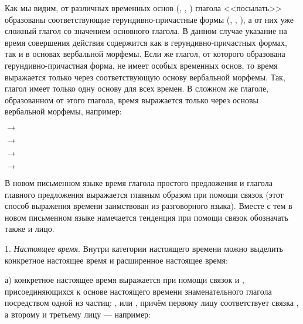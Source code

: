 Как мы видим, от различных временных основ (, , ) глагола <<посылать>> образованы соответствующие герундивно-причастные формы (, , ), а от них уже сложный глагол со значением основного глагола. В данном случае указание на время совершения действия содержится как в герундивно-причастных формах, так и в основах вербальной морфемы. Если же глагол, от которого образована герундивно-причастная форма, не имеет особых временных основ, то время выражается только через соответствующую основу вербальной морфемы. Так, глагол
 имеет только одну основу для всех времен. В сложном же глаголе, образованном от этого глагола, время выражается только через основы вербальной морфемы, например:

\begin{description}
	\item{} $\rightarrow$
	\item$\rightarrow$
	\item$\rightarrow$
	\item$\rightarrow$
\end{description}

В новом письменном языке время глагола простого предложения и глагола главного предложения выражается главным образом при помощи связок (этот способ выражения
времени заимствован из разговорного языка). Вместе с тем в новом письменном языке намечается тенденция при помощи связок обозначать также и лицо.

1. \emph{Настоящее время}. Внутри категории настоящего времени можно выделить конкретное настоящее время и расширенное настоящее время:

а) конкретное настоящее время выражается при помощи связок  и , присоединяющихся к основе настоящего времени знаменательного глагола посредством одной из частиц: ,  или , причём первому лицу соответствует связка , а второму и третьему лицу ---  например:

\begin{description}
	\item{}
	\item{}
	\item{}
\end{description}

